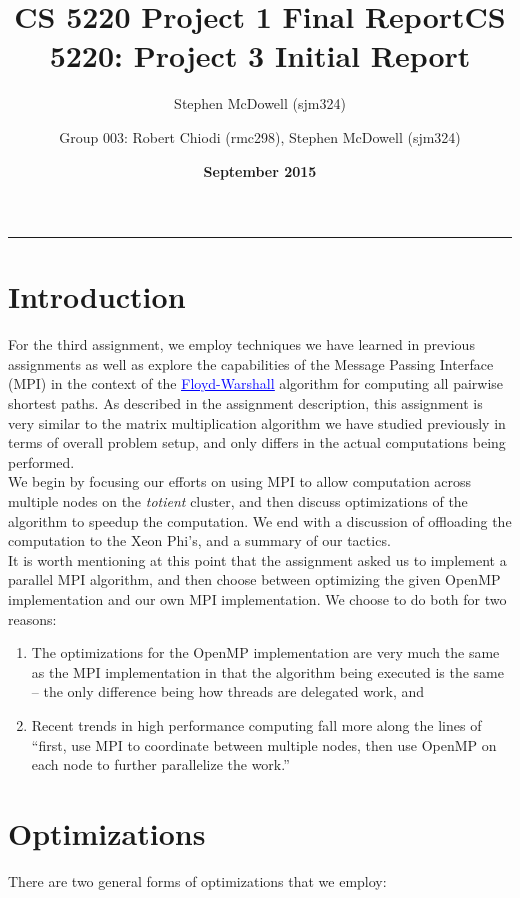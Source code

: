 \documentclass[11pt]{article}
\title{\textbf{CS 5220 Project 1 Final Report}}
\author{Stephen McDowell (sjm324)}
\date{\textbf{September 2015}}
\title{CS 5220: Project 3 Initial Report}
\author{Group 003: Robert Chiodi (rmc298), Stephen McDowell (sjm324)}
\makeatletter
\renewcommand{\maketitle}{\bgroup\setlength{\parindent}{0pt}
\begin{flushleft}
  {\Large \textsc{\@title}}\newline
  \textsc{\@author}
  \rule{\textwidth}{1pt}
\end{flushleft}\egroup
}
\makeatother
\begin{document}
\thispagestyle{empty}
\maketitle

\section{Introduction}
For the third assignment, we employ techniques we have learned in previous assignments as well as explore the capabilities of the Message Passing Interface (MPI) in the context of the \href{https://en.wikipedia.org/wiki/Floyd\%E2\%80\%93Warshall_algorithm}{\textcolor{blue}{\underline{Floyd-Warshall}}} algorithm for computing all pairwise shortest paths.  As described in the assignment description, this assignment is very similar to the matrix multiplication algorithm we have studied previously in terms of overall problem setup, and only differs in the actual computations being performed.\\

\noindent We begin by focusing our efforts on using MPI to allow computation across multiple nodes on the \emph{totient} cluster, and then discuss optimizations of the algorithm to speedup the computation.  We end with a discussion of offloading the computation to the Xeon Phi's, and a summary of our tactics.\\

\noindent It is worth mentioning at this point that the assignment asked us to implement a parallel MPI algorithm, and then choose between optimizing the given OpenMP implementation and our own MPI implementation.  We choose to do both for two reasons:

\begin{enumerate}[1.]
  \item The optimizations for the OpenMP implementation are very much the same as the MPI implementation in that the algorithm being executed is the same -- the only difference being how threads are delegated work, and
  \item Recent trends in high performance computing fall more along the lines of ``first, use MPI to coordinate between multiple nodes, then use OpenMP on each node to further parallelize the work.''
\end{enumerate}

\section{Optimizations}
There are two general forms of optimizations that we employ:
\end{document}
